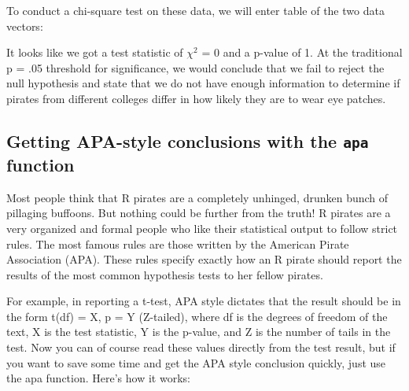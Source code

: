 \documentclass[]{book}
\newenvironment{Shaded}{\begin{snugshade}}{\end{snugshade}}
\newcommand{\KeywordTok}[1]{\textcolor[rgb]{0.13,0.29,0.53}{\textbf{#1}}}
\newcommand{\DataTypeTok}[1]{\textcolor[rgb]{0.13,0.29,0.53}{#1}}
\newcommand{\StringTok}[1]{\textcolor[rgb]{0.31,0.60,0.02}{#1}}
\newcommand{\CommentTok}[1]{\textcolor[rgb]{0.56,0.35,0.01}{\textit{#1}}}
\newcommand{\OperatorTok}[1]{\textcolor[rgb]{0.81,0.36,0.00}{\textbf{#1}}}
\newcommand{\NormalTok}[1]{#1}
\theoremstyle{definition}
\theoremstyle{definition}
\theoremstyle{remark}
\begin{document}
To conduct a chi-square test on these data, we will enter table of the
two data vectors:

\begin{Shaded}
\end{Shaded}

It looks like we got a test statistic of \(\chi^2\) = 0 and a p-value of
1. At the traditional p = .05 threshold for significance, we would
conclude that we fail to reject the null hypothesis and state that we do
not have enough information to determine if pirates from different
colleges differ in how likely they are to wear eye patches.

\subsection{\texorpdfstring{Getting APA-style conclusions with the
\texttt{apa}
function}{Getting APA-style conclusions with the apa function}}\label{getting-apa-style-conclusions-with-the-apa-function}

Most people think that R pirates are a completely unhinged, drunken
bunch of pillaging buffoons. But nothing could be further from the
truth! R pirates are a very organized and formal people who like their
statistical output to follow strict rules. The most famous rules are
those written by the American Pirate Association (APA). These rules
specify exactly how an R pirate should report the results of the most
common hypothesis tests to her fellow pirates.

For example, in reporting a t-test, APA style dictates that the result
should be in the form t(df) = X, p = Y (Z-tailed), where df is the
degrees of freedom of the text, X is the test statistic, Y is the
p-value, and Z is the number of tails in the test. Now you can of course
read these values directly from the test result, but if you want to save
some time and get the APA style conclusion quickly, just use the apa
function. Here's how it works:
\end{document}
